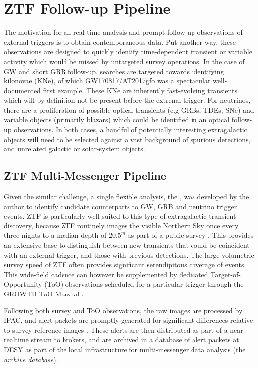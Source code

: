 \setchapterpreamble[u]{\margintoc}
\chapter{ZTF Follow-up Pipeline}

The motivation for all real-time analysis and prompt follow-up observations of external triggers is to obtain contemporaneous data. Put another way, these observations are designed to quickly identify time-dependent transient or variable activity which would be missed by untargeted survey operations.  In the case of GW and short GRB follow-up, searches are targeted towards identifying kilonovae (KNe), of which GW170817/AT2017gfo was a spectacular well-documented first example. These KNe are inherently fast-evolving transients which will by definition not be present before the extrenal trigger. For neutrinos, there are a proliferation of possible optical transients (e.g GRBs, TDEs, SNe) and variable objects (primarily blazars) which could be identified in an optical follow-up observations. In both cases, a handful of potentially interesting extragalactic objects will need to be selected against a vast background of spurious detections, and unrelated galactic or solar-system objects.

\section{ZTF Multi-Messenger Pipeline}
Given the similar challenge, a single flexible analysis, the \ztf, was developed by the author to identify candidate counterparts to GW, GRB and neutrino trigger events. ZTF is particularly well-suited to this type of extragalactic transient discovery,  because ZTF routinely images the visible Northern Sky once every three nights to a median depth of $20.5^{m}$ as part of a public survey .  This provides an extensive base to distinguish between new transients that could be coincident with an external trigger, and those with previous detections. The large volumetric survey speed of ZTF often provides significant serendipitous coverage of events. This wide-field cadence can however be supplemented by dedicated Target-of-Opportunity (ToO) observations scheduled for a particular trigger through the GROWTH ToO Marshal . 

Following both survey and ToO observations, the raw images are processed by IPAC, and alert packets are promptly generated for significant differences relative to survey reference images . These alerts are then distributed as part of a near-realtime stream to brokers, and are archived in a database of alert packets at DESY as part of the local infrastructure for multi-messenger data analysis (the \emph{archive database}).

